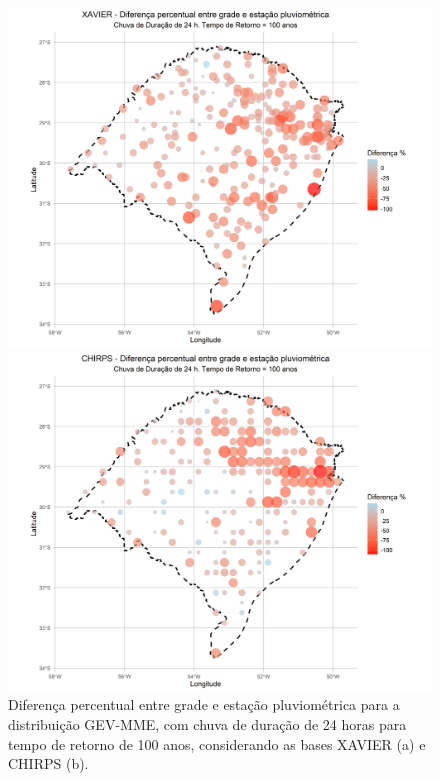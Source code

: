 \documentclass[
]{agujournal2019}
\begin{document}
\begin{figure}

\begin{minipage}{\linewidth}

\includegraphics{Figuras/Figura24a.png}

\end{minipage}%
\newline
\begin{minipage}{\linewidth}

\includegraphics{Figuras/Figura24b.png}

\end{minipage}%

\caption{\label{fig-Figura24}Diferença percentual entre grade e estação
pluviométrica para a distribuição GEV-MME, com chuva de duração de 24
horas para tempo de retorno de 100 anos, considerando as bases XAVIER
(a) e CHIRPS (b).}

\end{figure}%
\end{document}
